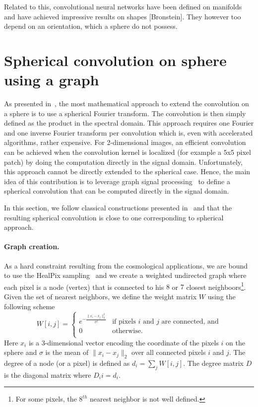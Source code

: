 \documentclass[preprint,12pt,authoryear]{elsarticle}
\newcommand{\nati}[1]{{\color[rgb]{.1,.6,.1}{#1}}}
\newcommand{\assign}[1]{{\color[rgb]{.8,.5,.8}{Assigned: #1 }}}
\begin{document}
Related to this, convolutional neural networks have been defined on manifolds and have achieved impressive results on shapes [Bronstein]. They however too depend on an orientation, which a sphere do not possess.

\section{Spherical convolution on sphere using a graph}
\assign{Nathanael}

As presented in~\cite{cohen2018spherical}, the most mathematical approach to extend the convolution on a sphere is to use a spherical Fourier transform. The convolution is then simply defined as the product in the spectral domain. This approach requires one Fourier and one inverse Fourier transform per convolution which is, even with accelerated algorithms, rather expensive. For 2-dimensional images, an efficient convolution can be achieved when the convolution kernel is localized (for example a 5x5 pixel patch) by doing the computation directly in the signal domain. Unfortunately, this approach cannot be directly extended to the spherical case. Hence, the main idea of this contribution is to leverage graph signal processing~\cite{shuman2013emerging} to define a spherical convolution that can be computed directly in the signal domain. 

In this section, we follow classical constructions presented in~\cite{cohen2018spherical,...} and \nati{show} that the resulting spherical convolution is close to one corresponding to spherical approach.

\paragraph{Graph creation.}
As a hard constraint resulting from the cosmological applications, we are bound to use the HealPix sampling~\cite{gorski2005healpix} and we create a weighted undirected graph where each pixel is a node (vertex) that is connected to his $8$ or $7$ closest neighboors\footnote{For some pixels, the $8^{th}$ nearest neighbor is not well defined.}. Given the set of nearest neighbors, we define the weight matrix $W$ using the following scheme
\begin{equation}
W[i,j]=\begin{cases}
e^{-\frac{\|x_i-x_j\|_2^2}{\sigma^2}} & \text{if pixels $i$ and $j$ are connected, and}\\
0 & \text{otherwise.}\\
\end{cases}
\end{equation}
Here $x_i$ is a 3-dimensional vector encoding the coordinate of the pixels $i$ on the sphere and $\sigma$ is the mean of $\|x_i-x_j\|_2$ over all connected pixels $i$ and $j$. The degree of a node (or a pixel) is defined as $d_i = \sum_j W[i,j]$. The degree matrix $D$ is the diagonal matrix where $D_ii=d_i$.
\end{document}

